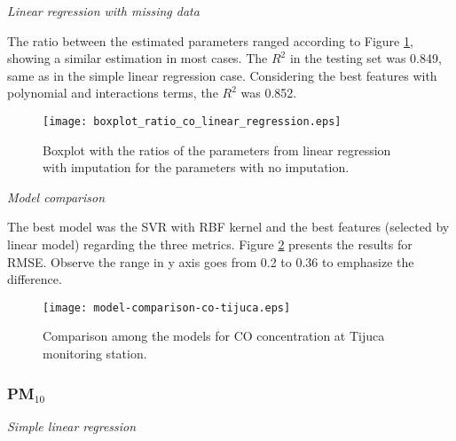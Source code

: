 \vspace{2mm}

{\em Linear regression with missing data} 

\vspace{2mm}

The ratio between the estimated parameters ranged according to Figure
\ref{fig:boxplot-co-linear-regression}, showing a similar estimation in most cases. The $R^2$ in the testing set was
0.849, same as in the simple
linear regression case. Considering the best features with polynomial and
interactions terms, the $R^2$ was 0.852. 

\begin{figure}
    \centering
    \texttt{[image: boxplot\_ratio\_co\_linear\_regression.eps]}
    \caption{Boxplot with the ratios of the parameters from linear regression
    with imputation for the parameters with no imputation.}
    \label{fig:boxplot-co-linear-regression}
\end{figure}

\vspace{2mm}

\vspace{2mm}

{\em Model comparison} 

\vspace{2mm}

The best model was the SVR with RBF kernel and the best features
(selected by linear model) regarding the three metrics. Figure
\ref{fig:model-comparison-co-tijuca} presents the results for RMSE. Observe
the range in y axis goes from 0.2 to 0.36 to emphasize the difference.

\begin{figure}
    \centering
    \texttt{[image: model-comparison-co-tijuca.eps]}
    \caption{Comparison among the models for CO concentration at Tijuca monitoring station.}
    \label{fig:model-comparison-co-tijuca}
\end{figure}


\subsubsection{PM\texorpdfstring{$_{10}$}{10}}

{\em Simple linear regression}

\vspace{2mm}

